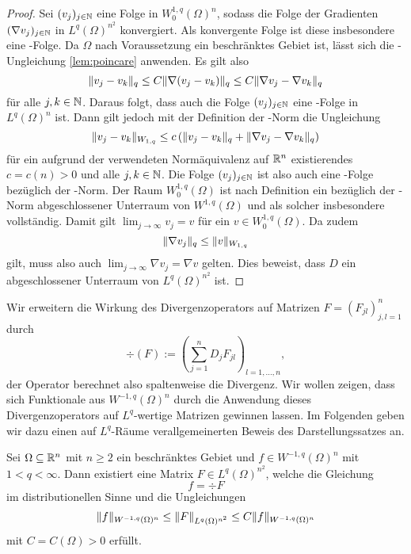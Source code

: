 \begin{proof}
  Sei $(v_j)_{j \in \mathbb{N}}$ eine Folge in $W_0^{1,q}(\Omega)^n$, sodass die Folge der Gradienten $(\nabla v_j)_{j \in \mathbb{N}}$ in $L^q(\Omega)^{n^2}$ konvergiert.
  Als konvergente Folge ist diese insbesondere eine \cauchy\hyp{}Folge.
  Da $\Omega$ nach Voraussetzung ein beschränktes Gebiet ist, lässt sich die \poincare\hyp{}Ungleichung \ref{lem:poincare} anwenden.
  Es gilt also
  $$
  \lVert v_j - v_k \rVert_q \leq C \lVert \nabla(v_j - v_k) \rVert_q \leq C \lVert \nabla v_j - \nabla v_k \rVert_q
  $$
  für alle $j,k \in \mathbb{N}$.
  Daraus folgt, dass auch die Folge $(v_j)_{j \in \mathbb{N}}$ eine \cauchy\hyp{}Folge in $L^q(\Omega)^n$ ist.
  Dann gilt jedoch mit der Definition der \sobolev\hyp{}Norm die Ungleichung
  $$
  \lVert v_j - v_k \rVert_{W_{1,q}} \leq c\, (\lVert v_j - v_k \rVert_q + \lVert \nabla v_j - \nabla v_k \rVert_q)
  $$
  für ein aufgrund der verwendeten Normäquivalenz auf $\mathbb{R}^n$ existierendes $c = c(n) > 0$ und alle $j,k \in \mathbb{N}$.
  Die Folge $(v_j)_{j \in \mathbb{N}}$ ist also auch eine \cauchy\hyp{}Folge bezüglich der \sobolev\hyp{}Norm.
  Der Raum $W_0^{1,q}(\Omega)$ ist nach Definition ein bezüglich der \sobolev\hyp{}Norm abgeschlossener Unterraum von $W^{1,q}(\Omega)$ und als solcher insbesondere vollständig.
  Damit gilt $\lim_{j \to \infty} v_j = v$ für ein $v \in W_0^{1,q}(\Omega)$.
  Da zudem
  $$
  \lVert \nabla v_j \rVert_q \leq \lVert v \rVert_{W_{1,q}}  
  $$
  gilt, muss also auch $\lim_{j \to \infty} \nabla v_j = \nabla v$ gelten.
  Dies beweist, dass $D$ ein abgeschlossener Unterraum von $L^q(\Omega)^{n^2}$ ist.
\end{proof}

Wir erweitern die Wirkung des Divergenzoperators auf Matrizen $F = (F_{jl})_{j,l=1}^n$ durch
\begin{equation}
  \label{eq:divMatrix}
  \div(F) := (\sum_{j = 1}^n D_j F_{jl})_{l = 1,\dots,n},
\end{equation}
der Operator berechnet also spaltenweise die Divergenz.
Wir wollen zeigen, dass sich Funktionale aus $W^{-1,q}(\Omega)^n$ durch die Anwendung dieses Divergenzoperators auf $L^q$\hyp{}wertige Matrizen gewinnen lassen.
Im Folgenden geben wir dazu einen auf $L^q$\hyp{}Räume verallgemeinerten Beweis des Darstellungssatzes \cite[S.61, Lemma 1.6.1]{sohr2001navier} an.

\begin{lem}
  \label{lem:divRepresentation}
  Sei $\Omega \subseteq \mathbb{R}^n$ mit $n \geq 2$ ein beschränktes Gebiet und $f \in W^{-1,q}(\Omega)^n$ mit $1 < q < \infty$.
  Dann existiert eine Matrix $F \in L^q(\Omega)^{n^2}$, welche die Gleichung
  $$ f = \div F $$
  im distributionellen Sinne und die Ungleichungen
  \begin{equation}
    \label{eq:ineqDivRepresentation}
    \lVert  f  \rVert_{W^{-1,q}(\Omega)^n} 
    \leq \lVert  F  \rVert_{L^q(\Omega)^{n^2}} 
    \leq C \lVert  f  \rVert_{W^{-1,q}(\Omega)^n}
  \end{equation}
  mit $C = C(\Omega) > 0$ erfüllt.
\end{lem}

